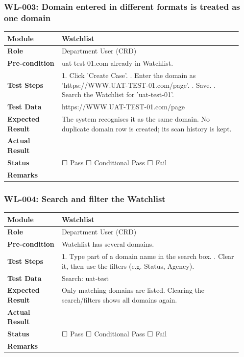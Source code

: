 \documentclass[10pt]{article}
\begin{document}
\subsubsection*{WL-003: Domain entered in different formats is treated as one domain}
\begin{longtable}{p{0.22\linewidth}p{0.73\linewidth}}
\hline
\textbf{Module} & Watchlist \\ \hline
\textbf{Role} & Department User (CRD) \\ \hline
\textbf{Pre-condition} & uat-test-01.com already in Watchlist. \\ \hline
\textbf{Test Steps} & 1. Click 'Create Case'. \newline 2. Enter the domain as 'https://WWW.UAT-TEST-01.com/page'. \newline 3. Save. \newline 4. Search the Watchlist for 'uat-test-01'. \\ \hline
\textbf{Test Data} & https://WWW.UAT-TEST-01.com/page \\ \hline
\textbf{Expected Result} & The system recognises it as the same domain. No duplicate domain row is created; its scan history is kept. \\ \hline
\textbf{Actual Result} & \newline \newline \\ \hline
\textbf{Status} & ☐ Pass \quad ☐ Conditional Pass \quad ☐ Fail \\ \hline
\textbf{Remarks} & \newline \\ \hline
\end{longtable}
\subsubsection*{WL-004: Search and filter the Watchlist}
\begin{longtable}{p{0.22\linewidth}p{0.73\linewidth}}
\hline
\textbf{Module} & Watchlist \\ \hline
\textbf{Role} & Department User (CRD) \\ \hline
\textbf{Pre-condition} & Watchlist has several domains. \\ \hline
\textbf{Test Steps} & 1. Type part of a domain name in the search box. \newline 2. Clear it, then use the filters (e.g. Status, Agency). \\ \hline
\textbf{Test Data} & Search: uat-test \\ \hline
\textbf{Expected Result} & Only matching domains are listed. Clearing the search/filters shows all domains again. \\ \hline
\textbf{Actual Result} & \newline \newline \\ \hline
\textbf{Status} & ☐ Pass \quad ☐ Conditional Pass \quad ☐ Fail \\ \hline
\textbf{Remarks} & \newline \\ \hline
\end{longtable}
\end{document}
